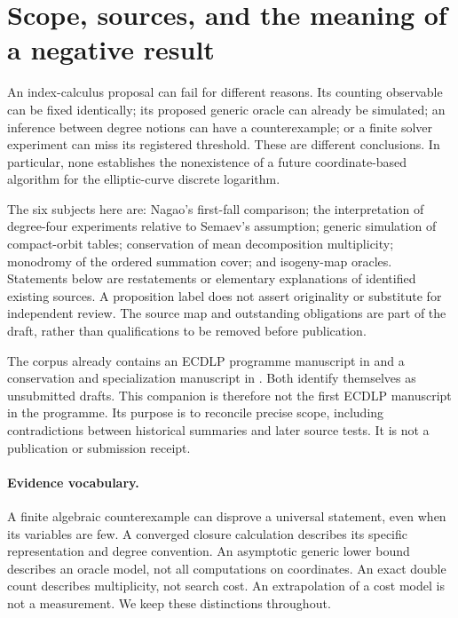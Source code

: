 \section{Scope, sources, and the meaning of a negative result}

An index-calculus proposal can fail for different reasons. Its counting
observable can be fixed identically; its proposed generic oracle can already
be simulated; an inference between degree notions can have a counterexample;
or a finite solver experiment can miss its registered threshold. These are
different conclusions. In particular, none establishes the nonexistence of a
future coordinate-based algorithm for the elliptic-curve discrete logarithm.

The six subjects here are: Nagao's first-fall comparison; the interpretation
of degree-four experiments relative to Semaev's assumption; generic simulation
of compact-orbit tables; conservation of mean decomposition multiplicity;
monodromy of the ordered summation cover; and isogeny-map oracles. Statements
below are restatements or elementary explanations of identified existing
sources. A proposition label does not assert originality or substitute for
independent review. The source map and outstanding obligations are part of
the draft, rather than qualifications to be removed before publication.

The corpus already contains an ECDLP programme manuscript in
 and a conservation and
specialization manuscript in
.
Both identify themselves as unsubmitted drafts. This companion is therefore
not the first ECDLP manuscript in the programme. Its purpose is to reconcile
precise scope, including contradictions between historical summaries and
later source tests. It is not a publication or submission receipt.

\paragraph{Evidence vocabulary.}
A finite algebraic counterexample can disprove a universal statement, even
when its variables are few. A converged closure calculation describes its
specific representation and degree convention. An asymptotic generic lower
bound describes an oracle model, not all computations on coordinates.
An exact double count describes multiplicity, not search cost. An
extrapolation of a cost model is not a measurement. We keep these distinctions
throughout.

\begin{center}
\end{center}
